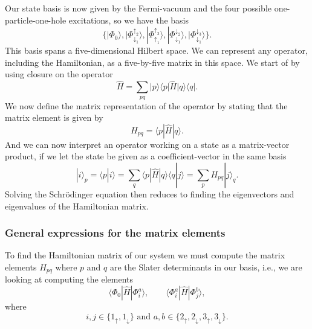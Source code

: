 \documentclass[a4paper, 11pt, notitlepage, english]{article}
\newcommand{\bra}[1]{\langle #1|}
\newcommand{\ket}[1]{|#1 \rangle}
\newcommand{\braket}[2]{\langle #1 | #2 \rangle}
\newcommand{\op}[1]{\hat{#1}}
\newcommand{\braopket}[3]{\langle #1 | {#2} | #3 \rangle}
\renewcommand{\d}{{\rm d}}
\renewcommand{\u}{\uparrow}
\renewcommand{\d}{\downarrow}
\newcommand{\ui}{{\u_1}}
\newcommand{\uii}{{\u_2}}
\newcommand{\uiii}{{\u_3}}
\newcommand{\di}{{\d_1}}
\newcommand{\dii}{{\d_2}}
\newcommand{\diii}{{\d_3}}
\begin{document}
Our state basis is now given by the Fermi-vacuum and the four possible one-particle-one-hole excitations, so we have the basis
$$\{\ket{\Phi_0}, \ket{\Phi_\di^\uii}, \ket{\Phi_\ui^\uiii}, \ket{\Phi_\di^\dii}, \ket{\Phi_\di^\diii}\}.$$
This basis spans a five-dimensional Hilbert space. We can represent any operator, including the Hamiltonian, as a five-by-five matrix in this space. We start of by using closure on the operator
$$\op{H} = \sum_{pq} \ket{p}\braopket{p}{\op{H}}{q}\bra{q}.$$
We now define the matrix representation of the operator by stating that the matrix element is given by
$$H_{pq} = \braopket{p}{\op{H}}{q}.$$
And we can now interpret an operator working on a state as a matrix-vector product, if we let the state be given as a coefficient-vector in the same basis
$$\ket{i}_p = \braket{p}{i} = \sum_q \braopket{p}{\op{H}}{q} \braket{q}{j} = \sum_p H_{pq}\ket{j}_q.$$
Solving the Schrödinger equation then reduces to finding the eigenvectors and eigenvalues of the Hamiltonian matrix.

\subsubsection*{General expressions for the matrix elements}
To find the Hamiltonian matrix of our system we must compute the matrix elements $H_{pq}$ where $p$ and $q$ are the Slater determinants in our basis, i.e., we are looking at computing the elements
$$\braopket{\Phi_0}{\op{H}}{\Phi_i^a}, \qquad \braopket{\Phi_i^a}{\op{H}}{\Phi_j^b},$$
where 
$$i, j \in \{1_\u, 1_\d\} \mbox{ and } a, b \in \{2_\u, 2_\d, 3_\u, 3_\d \}.$$
\end{document}
